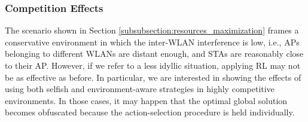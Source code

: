 \documentclass[preprint,12pt]{elsarticle}
\begin{document}
\subsubsection{Competition Effects}
\label{subsubsection:competition}  

The scenario shown in Section \ref{subsubsection:resources_maximization} frames a conservative environment in which the inter-WLAN interference is low, i.e., APs belonging to different WLANs are distant enough, and STAs are reasonably close to their AP. However, if we refer to a less idyllic situation, applying RL may not be as effective as before. In particular, we are interested in showing the effects of using both selfish and environment-aware strategies in highly competitive environments. In those cases, it may happen that the optimal global solution becomes obfuscated because the action-selection procedure is held individually. 
\end{document}
